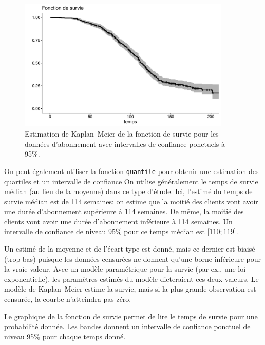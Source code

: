 \documentclass[
  11pt,
  letterpaper,
]{scrbook}
\theoremstyle{definition}
\theoremstyle{remark}
\begin{document}
\begin{figure}[ht!]

{\centering \includegraphics[width=0.9\textwidth,height=\textheight]{survie_files/figure-pdf/fig-km-survie1-1.pdf}

}

\caption{\label{fig-km-survie1}Estimation de Kaplan--Meier de la
fonction de survie pour les données d'abonnement avec intervalles de
confiance ponctuels à 95\%.}

\end{figure}

On peut également utiliser la fonction \texttt{quantile} pour obtenir
une estimation des quartiles et un intervalle de confiance On utilise
généralement le temps de survie médian (au lieu de la moyenne) dans ce
type d'étude. Ici, l'estimé du temps de survie médian est de 114
semaines: on estime que la moitié des clients vont avoir une durée
d'abonnement supérieure à 114 semaines. De même, la moitié des clients
vont avoir une durée d'abonnement inférieure à 114 semaines. Un
intervalle de confiance de niveau 95\% pour ce temps médian est
{[}\(110; 119\){]}.

Un estimé de la moyenne et de l'écart-type est donné, mais ce dernier
est biaisé (trop bas) puisque les données censurées ne donnent qu'une
borne inférieure pour la vraie valeur. Avec un modèle paramétrique pour
la survie (par ex., une loi exponentielle), les paramètres estimés du
modèle dicteraient ces deux valeurs. Le modèle de Kaplan--Meier estime
la survie, mais si la plus grande observation est censurée, la courbe
n'atteindra pas zéro.

Le graphique de la fonction de survie permet de lire le temps de survie
pour une probabilité donnée. Les bandes donnent un intervalle de
confiance ponctuel de niveau 95\% pour chaque temps donné.
\end{document}
